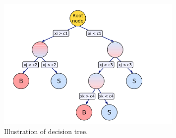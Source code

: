 \begin{figure}
\begin{center}
\includegraphics[width=0.8\textwidth,keepaspectratio]{plots_and_figures/chapter5/decision_tree.png}
\caption{Illustration of decision tree.~\cite{tmva_manual}}
\label{fig:dec_tree}
\end{center}
\end{figure}


